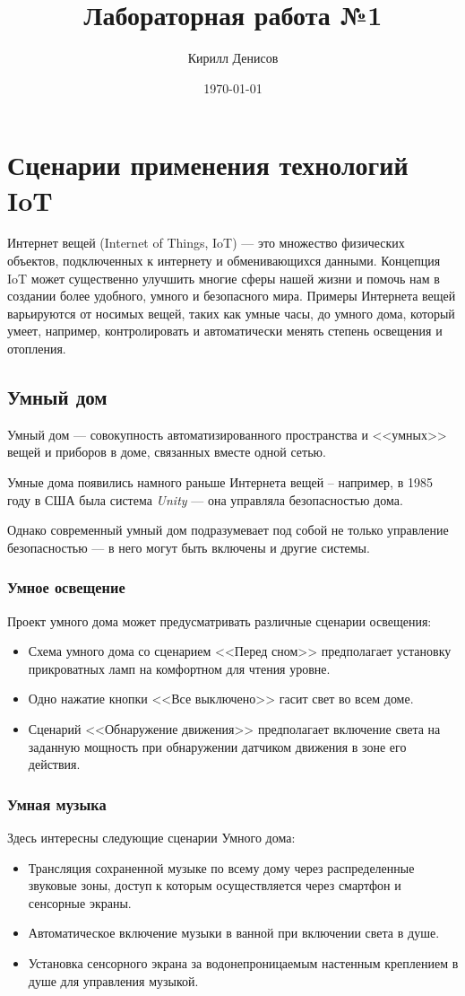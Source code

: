 \documentclass[a4paper,14pt]{extarticle}
\author{Кирилл Денисов}
\title{Лабораторная работа №1}
\date{\today}
\newcommand{\pathToCommonFolder}{/home/denilai/Documents/repos/latex/Common}
\begin{document}
	\thispagestyle{empty}
	
	\newpage
	\tableofcontents
	\newpage
	
\section{Сценарии применения технологий IoT}
Интернет вещей (Internet of Things, IoT) --- это множество физических объектов, подключенных к интернету и обменивающихся данными. Концепция IoT может существенно улучшить многие сферы нашей жизни и помочь нам в создании более удобного, умного и безопасного мира. Примеры Интернета вещей варьируются от носимых вещей, таких как умные часы, до умного дома, который умеет, например, контролировать и автоматически менять степень освещения и отопления. 
\subsection*{Умный дом}

Умный дом --- совокупность автоматизированного пространства и <<умных>> вещей и приборов в доме, связанных вместе одной сетью.

Умные дома появились намного раньше Интернета вещей -- например, в 1985 году в США была система \textit{Unity} — она управляла безопасностью дома.

Однако современный умный дом подразумевает под собой не только управление безопасностью — в него могут быть включены и другие системы.
\subsubsection*{Умное освещение}
Проект умного дома может предусматривать различные сценарии освещения:
\begin{itemize}
\item Схема умного дома со сценарием <<Перед сном>> предполагает установку прикроватных ламп на комфортном для чтения уровне.
\item Одно нажатие кнопки <<Все выключено>> гасит свет во всем доме.
\item Сценарий <<Обнаружение движения>> предполагает включение света на заданную мощность при обнаружении датчиком движения в зоне его действия.
\end{itemize}

\subsubsection*{Умная музыка}
Здесь интересны следующие сценарии Умного дома:
\begin{itemize}
	\item Трансляция сохраненной музыке по всему дому через распределенные звуковые зоны, доступ к которым осуществляется через  смартфон и сенсорные экраны.
	\item Автоматическое включение музыки в ванной при включении света в душе.
	\item Установка сенсорного экрана за водонепроницаемым настенным креплением в душе для управления музыкой. 
\end{itemize}
\end{document}
